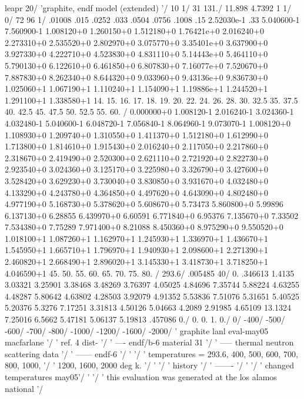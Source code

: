 \small
\begin{ccode}

 leapr
 20/
 'graphite, endf model (extended) '/
 10 1/
 31 131./
 11.898 4.7392 1 1/
 0/
 72 96 1/
 .01008 .015 .0252 .033 .0504 .0756 .1008 .15
 2.52030e-1 .33 5.040600-1 7.560900-1 1.008120+0 1.260150+0 1.512180+0
 1.76421e+0 2.016240+0 2.273310+0 2.535520+0 2.802970+0 3.075770+0
 3.35401e+0 3.637900+0 3.927330+0 4.222710+0 4.523830+0 4.831110+0
 5.14443e+0 5.464110+0 5.790130+0 6.122610+0 6.461850+0 6.807830+0
 7.16077e+0 7.520670+0 7.887830+0 8.262340+0 8.644320+0 9.033960+0
 9.43136e+0 9.836730+0 1.025060+1 1.067190+1 1.110240+1 1.154090+1
 1.19886e+1 1.244520+1 1.291100+1 1.338580+1 14. 15. 16. 17. 18.
  19. 20. 22. 24. 26. 28. 30. 32.5 35. 37.5 40. 42.5 45. 47.5
  50. 52.5 55. 60. /
 0.000000+0 1.008120-1 2.016240-1 3.024360-1 4.032480-1 5.040600-1
 6.048720-1 7.056840-1 8.064960-1 9.073070-1 1.008120+0 1.108930+0
 1.209740+0 1.310550+0 1.411370+0 1.512180+0 1.612990+0 1.713800+0
 1.814610+0 1.915430+0 2.016240+0 2.117050+0 2.217860+0 2.318670+0
 2.419490+0 2.520300+0 2.621110+0 2.721920+0 2.822730+0 2.923540+0
 3.024360+0 3.125170+0 3.225980+0 3.326790+0 3.427600+0 3.528420+0
 3.629230+0 3.730040+0 3.830850+0 3.931670+0 4.032480+0 4.133290+0
 4.243780+0 4.364850+0 4.497620+0 4.643090+0 4.802480+0 4.977190+0
 5.168730+0 5.378620+0 5.608670+0 5.73473 5.860800+0 5.99896
 6.137130+0 6.28855 6.439970+0 6.60591
 6.771840+0 6.95376 7.135670+0 7.33502 7.534380+0 7.75289
 7.971400+0 8.21088 8.450360+0 8.975290+0
 9.550520+0 1.018100+1 1.087260+1 1.162970+1 1.245930+1 1.336970+1
 1.436670+1 1.545950+1 1.665710+1 1.796970+1 1.940930+1 2.098600+1
 2.271390+1 2.460820+1 2.668490+1 2.896020+1 3.145330+1 3.418730+1
 3.718250+1 4.046590+1 45. 50. 55. 60. 65. 70. 75. 80. /
 293.6/
 .005485 40/
  0. .346613 1.4135 3.03321 3.25901 3.38468 3.48269
  3.76397 4.05025 4.84696 7.35744 5.88224 4.63255
  4.48287 5.80642 4.63802 4.28503 3.92079 4.91352
  5.53836 7.51076 5.31651 5.40525 5.20376 5.3276
  7.17251 3.31813 4.50126 5.04663 4.2089 2.91985
  4.65109 13.1324 7.25016 6.5662 5.47181 5.06137
  5.19813 .457086 0./
 0. 0. 1. 0./
 0/
-400/
-500/
-600/
-700/
-800/
-1000/
-1200/
-1600/
-2000/
' graphite  lanl       eval-may05 macfarlane '/
' ref. 4               dist- '/
' ---- endf/b-6        material 31 '/
' ----- thermal neutron scattering data '/
' ------ endf-6 '/
'  '/
'  temperatures = 293.6, 400, 500, 600, 700, 800, 1000,  '/
'                    1200, 1600, 2000 deg k. '/
'  '/
' history '/
' ------- '/
' '/
' changed temperatures may05'/
' '/
' this evaluation was generated at the los alamos national '/

\end{ccode}
